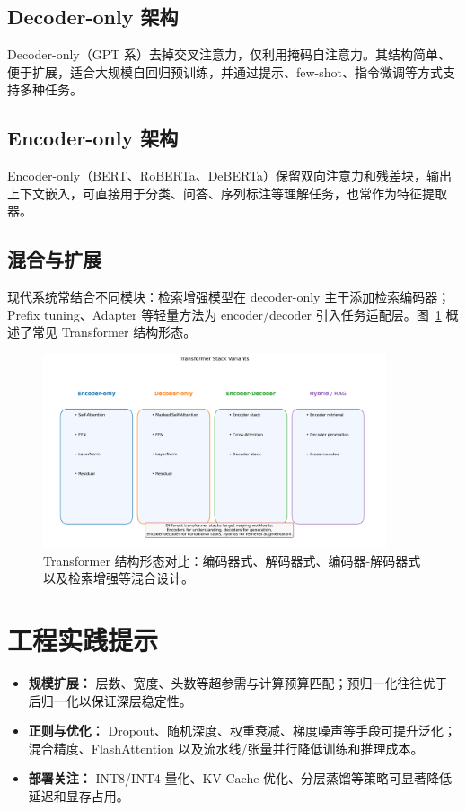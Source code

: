 \documentclass[UTF8,zihao=-4]{ctexart}
\begin{document}
\subsection{Decoder-only 架构}
Decoder-only（GPT 系）去掉交叉注意力，仅利用掩码自注意力。其结构简单、便于扩展，适合大规模自回归预训练，并通过提示、few-shot、指令微调等方式支持多种任务。

\subsection{Encoder-only 架构}
Encoder-only（BERT、RoBERTa、DeBERTa）保留双向注意力和残差块，输出上下文嵌入，可直接用于分类、问答、序列标注等理解任务，也常作为特征提取器。

\subsection{混合与扩展}
现代系统常结合不同模块：检索增强模型在 decoder-only 主干添加检索编码器；Prefix tuning、Adapter 等轻量方法为 encoder/decoder 引入任务适配层。图~\ref{fig:transformer_stack_variants_cn} 概述了常见 Transformer 结构形态。

\begin{figure}[H]
  \centering
  \includegraphics[width=0.9\textwidth]{transformer_stack_variants.png}
  \caption{Transformer 结构形态对比：编码器式、解码器式、编码器-解码器式以及检索增强等混合设计。}
  \label{fig:transformer_stack_variants_cn}
\end{figure}
\FloatBarrier

\section{工程实践提示}
\begin{itemize}
  \item \textbf{规模扩展：} 层数、宽度、头数等超参需与计算预算匹配；预归一化往往优于后归一化以保证深层稳定性。
  \item \textbf{正则与优化：} Dropout、随机深度、权重衰减、梯度噪声等手段可提升泛化；混合精度、FlashAttention 以及流水线/张量并行降低训练和推理成本。
  \item \textbf{部署关注：} INT8/INT4 量化、KV Cache 优化、分层蒸馏等策略可显著降低延迟和显存占用。
\end{itemize}
\end{document}
